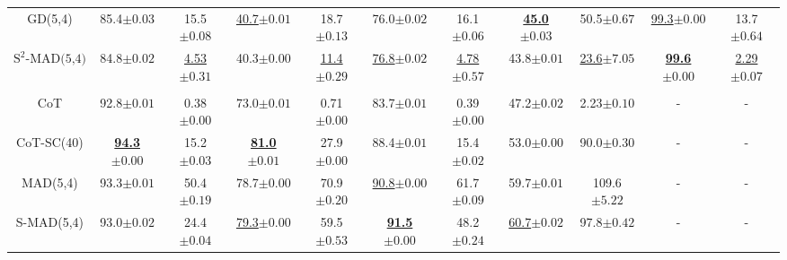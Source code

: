 \begin{table*}[t]
{\begin{tabular}{ccccccccccc}
    GD(5,4)                  & 85.4\scriptsize{$\pm 0.03$} & 15.5\scriptsize{$\pm 0.08$}          & \underline{40.7}\scriptsize{$\pm 0.01$} & 18.7\scriptsize{$\pm 0.13$}         & 76.0\scriptsize{$\pm 0.02$} & 16.1\scriptsize{$\pm 0.06$}                & \underline{\textbf{45.0}}\scriptsize{$\pm 0.03$} & 50.5\scriptsize{$\pm 0.67$}         & \underline{99.3}\scriptsize{$\pm 0.00$} & 13.7\scriptsize{$\pm 0.64$}           \\ 
    \({\text{S}^2\text{-MAD(5,4)}}\)                  & 84.8\scriptsize{$\pm 0.02$} & \underline{4.53}\scriptsize{$\pm 0.31$}          & 40.3\scriptsize{$\pm 0.00$} & \underline{11.4}\scriptsize{$\pm 0.29$}         & \underline{76.8}\scriptsize{$\pm 0.02$} & \underline{4.78}\scriptsize{$\pm 0.57$}                & 43.8\scriptsize{$\pm 0.01$} & \underline{23.6}\scriptsize{$\pm 7.05$}         & \underline{\textbf{99.6}}\scriptsize{$\pm 0.00$} & \underline{2.29}\scriptsize{$\pm 0.07$}           \\
    \midrule
    \rowcolor{Gray}
    \multicolumn{11}{c}{\texttt{GPT-4-0613}} 
    \\
    \midrule
    CoT                      & 92.8\scriptsize{$\pm 0.01$} & 0.38\scriptsize{$\pm 0.00$}           & 73.0\scriptsize{$\pm 0.01$} & 0.71\scriptsize{$\pm 0.00$}         & 83.7\scriptsize{$\pm 0.01$} & 0.39\scriptsize{$\pm 0.00$}                & 47.2\scriptsize{$\pm 0.02$}  & 2.23\scriptsize{$\pm 0.10$}         & - & -          \\
    CoT-SC(40)               & \underline{\textbf{94.3}}\scriptsize{$\pm 0.00$} & 15.2\scriptsize{$\pm 0.03$}          & \underline{\textbf{81.0}}\scriptsize{$\pm 0.01$}  & 27.9\scriptsize{$\pm 0.00$}         & 88.4\scriptsize{$\pm 0.01$}     & 15.4\scriptsize{$\pm 0.02$}                & 53.0\scriptsize{$\pm 0.00$} & 90.0\scriptsize{$\pm 0.30$}         & - & -           \\
    MAD(5,4)                 & 93.3\scriptsize{$\pm 0.01$} & 50.4\scriptsize{$\pm 0.19$}          & 78.7\scriptsize{$\pm 0.00$} & 70.9\scriptsize{$\pm 0.20$}        & \underline{90.8}\scriptsize{$\pm 0.00$} & 61.7\scriptsize{$\pm 0.09$}                & 59.7\scriptsize{$\pm 0.01$} & 109.6\scriptsize{$\pm 5.22$}         & - & -           \\ 
    S-MAD(5,4)                 & 93.0\scriptsize{$\pm 0.02$} & 24.4\scriptsize{$\pm 0.04$}          & \underline{79.3}\scriptsize{$\pm 0.00$}  & 59.5\scriptsize{$\pm 0.53$}        & \underline{\textbf{91.5}}\scriptsize{$\pm 0.00$} & 48.2\scriptsize{$\pm 0.24$}                 & \underline{60.7}\scriptsize{$\pm 0.02$} & 97.8\scriptsize{$\pm 0.42$}         & -  & -           \\ 

\end{tabular}}
\end{table*}
